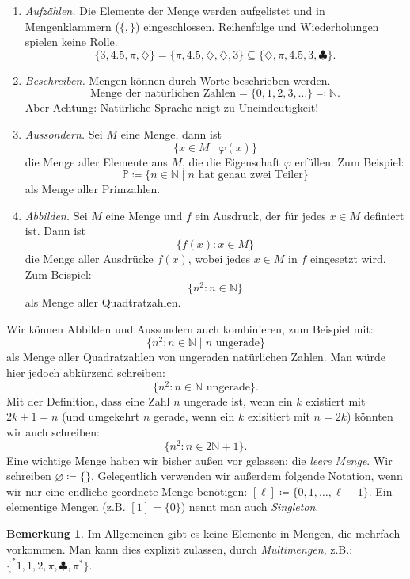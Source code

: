 \documentclass[11pt, a4paper]{article}
\theoremstyle{definition}
\newtheorem*{remark*}{Bemerkung}
\theoremstyle{plain}
\numberwithin{equation}{section}
\let\emptyset\varnothing
\begin{document}
\begin{enumerate}
	\item \textit{Aufzählen.} Die Elemente der Menge werden aufgelistet und in Mengenklammern ($\{, \}$) eingeschlossen. Reihenfolge und Wiederholungen spielen keine Rolle.
		$$
			\{ 3, 4.5, \pi, \diamondsuit \} = \{ \pi, 4.5, \diamondsuit, \diamondsuit, 3 \} \subseteq \{ \diamondsuit, \pi, 4.5, 3, \clubsuit \}. 
		$$
	\item \textit{Beschreiben.} Mengen können durch Worte beschrieben werden.
		$$
			\text{Menge der natürlichen Zahlen} = \{ 0, 1, 2, 3, \ldots \} \eqqcolon \mathbb{N}.
		$$
		Aber Achtung: Natürliche Sprache neigt zu Uneindeutigkeit!
	\item \textit{Aussondern.} Sei $M$ eine Menge, dann ist
		$$
			\{ x \in M \mid \varphi(x) \}
		$$
		die Menge aller Elemente aus $M$, die die Eigenschaft $\varphi$ erfüllen. Zum Beispiel:
		$$
			\mathbb{P} \coloneqq \{ n \in \mathbb{N} \mid n \text{ hat genau zwei Teiler} \}
		$$
		als Menge aller Primzahlen.
	\item \textit{Abbilden.} Sei $M$ eine Menge und $f$ ein Ausdruck, der für jedes $x \in M$ definiert ist. Dann ist
		$$
			\{ f(x) : x \in M \}
		$$
		die Menge aller Ausdrücke $f(x)$, wobei jedes $x \in M$ in $f$ eingesetzt wird. Zum Beispiel:
		$$
			\{ n^2 : n \in \mathbb{N} \}
		$$
		als Menge aller Quadtratzahlen.
\end{enumerate}
Wir können Abbilden und Aussondern auch kombinieren, zum Beispiel mit:
$$
	\{ n^2 : n \in \mathbb{N} \mid n \text{ ungerade} \}
$$
als Menge aller Quadratzahlen von ungeraden natürlichen Zahlen. Man würde hier jedoch abkürzend schreiben:
$$
	\{ n^2 : n \in \mathbb{N} \text{ ungerade} \}.
$$
Mit der Definition, dass eine Zahl $n$ ungerade ist, wenn ein $k$ existiert mit $2k+1 = n$ (und umgekehrt $n$ gerade, wenn ein $k$ exisitiert mit $n = 2k$) könnten wir auch schreiben:
$$
	\{ n^2 : n \in 2\mathbb{N}+1 \}.
$$
Eine wichtige Menge haben wir bisher außen vor gelassen: die \textit{leere Menge}. Wir schreiben $\emptyset \coloneqq \{ \}$. Gelegentlich verwenden wir außerdem folgende Notation, wenn wir nur eine endliche geordnete Menge benötigen: $[\ell] \coloneqq \{ 0, 1, \ldots, \ell-1 \}$. Ein-elementige Mengen (z.B. $[1] = \{ 0 \}$) nennt man auch \textit{Singleton}.
\begin{remark*}
	Im Allgemeinen gibt es keine Elemente in Mengen, die mehrfach vorkommen. Man kann dies explizit zulassen, durch \textit{Multimengen}, z.B.: $\{^\ast 1, 1, 2, \pi, \clubsuit, \pi ^\ast\}$.
\end{remark*}
\end{document}
